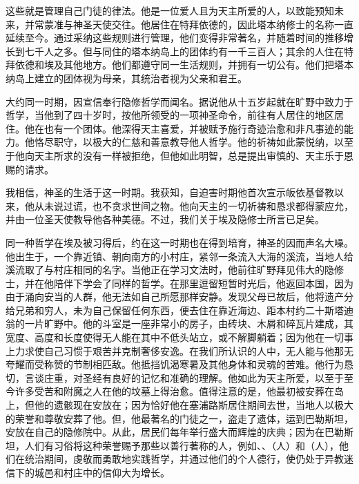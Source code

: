 这些就是管理自己门徒的律法。他是一位爱人且为天主所爱的人，以致能预知未来，并常蒙准与神圣天使交往。他居住在特拜依德的，因此塔本纳修士的名称一直延续至今。通过采纳这些规则进行管理，他们变得非常著名，并随着时间的推移增长到七千人之多。但与同住的塔本纳岛上的团体约有一千三百人；其余的人住在特拜依德和埃及其他地方。他们都遵守同一生活规则，并拥有一切公有。他们把塔本纳岛上建立的团体视为母亲，其统治者视为父亲和君王。\par

大约同一时期，因宣信奉行隐修哲学而闻名。据说他从十五岁起就在旷野中致力于哲学，当他到了四十岁时，按他所领受的一项神圣命令，前往有人居住的地区居住。他在也有一个团体。他深得天主喜爱，并被赋予施行奇迹治愈和非凡事迹的能力。他恪尽职守，以极大的仁慈和善意教导他人哲学。他的祈祷如此蒙悦纳，以至于他向天主所求的没有一样被拒绝，但他如此明智，总是提出审慎的、天主乐于恩赐的请求。\par

我相信，神圣的生活于这一时期。我获知，自迫害时期他首次宣示皈依基督教以来，他从未说过谎，也不贪求世间之物。他向天主的一切祈祷和恳求都得蒙应允，并由一位圣天使教导他各种美德。不过，我们关于埃及隐修士所言已足矣。\par

同一种哲学在埃及被习得后，约在这一时期也在得到培育，神圣的因而声名大噪。他出生于，一个靠近镇、朝向南方的小村庄，紧邻一条流入大海的溪流，当地人给溪流取了与村庄相同的名字。当他正在学习文法时，他前往旷野拜见伟大的隐修士，并在他陪伴下学会了同样的哲学。在那里逗留短暂时光后，他返回本国，因为由于涌向安当的人群，他无法如自己所愿那样安静。发现父母已故后，他将遗产分给兄弟和穷人，未为自己保留任何东西，便去住在靠近海边、距本村约二十斯塔迪翁的一片旷野中。他的斗室是一座非常小的房子，由砖块、木屑和碎瓦片建成，其宽度、高度和长度使得无人能在其中不低头站立，或不解脚躺着；因为他在一切事上力求使自己习惯于艰苦并克制奢侈安逸。在我们所认识的人中，无人能与他那无夸耀而受称赞的节制相匹敌。他抵挡饥渴寒暑及其他身体和灵魂的苦难。他行为恳切，言谈庄重，对圣经有良好的记忆和准确的理解。他如此为天主所爱，以至于至今许多受苦和附魔之人在他的坟墓上得治愈。值得注意的是，他最初被安葬在岛上，但他的遗骸现在安放在；因为恰好他在塞浦路斯居住期间去世，当地人以极大的荣誉和尊敬安葬了他。但，他最著名的门徒之一，盗走了遗体，运到巴勒斯坦，安放在自己的隐修院中。从此，居民们每年举行盛大而辉煌的庆典；因为在巴勒斯坦，人们有习俗将这种荣誉赐予那些以善行著称的人，例如、、（人）和（人），他们在统治期间，虔敬而勇敢地实践哲学，并通过他们的个人德行，使仍处于异教迷信下的城邑和村庄中的信仰大为增长。\par


